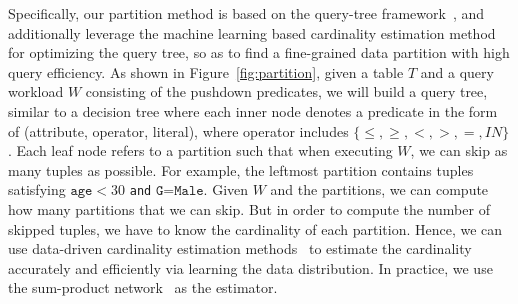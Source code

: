 Specifically, our partition method is based on the query-tree framework~\cite{}, and additionally leverage the machine learning based cardinality estimation method for optimizing the query tree, so as to find a fine-grained data partition with high query efficiency. 
As shown in Figure~\ref{fig:partition}, given a table $T$ and a query workload $W$ consisting of the pushdown predicates, we will build a query tree, similar to a decision tree where each inner node denotes a predicate in the form of (attribute, operator, literal), where operator includes $\{\leq, \geq, <, >, =, IN\}$. Each leaf node refers to a partition such that when executing $W$, we can skip as many tuples as possible. For example, the leftmost partition contains tuples satisfying $\texttt{age}<30$ \texttt{and} $\texttt{G=Male}$. Given $W$ and the partitions, we can compute how many partitions that we can skip. But in order to compute the number of skipped tuples, we have to know the cardinality of each partition. Hence, we can use data-driven cardinality estimation methods~\cite{} to estimate the cardinality accurately and efficiently via learning the data distribution. In practice, we use the sum-product network~\cite{} as the estimator. 




